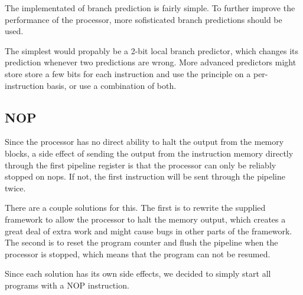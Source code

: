 The implementated of branch prediction is fairly simple. To further improve the
performance of the processor, more sofisticated branch predictions should be
used.

The simplest would propably be a 2-bit local branch predictor, which changes its prediction whenever two predictions are wrong.
More advanced predictors might store store a few bits for each instruction and use the principle on a per-instruction basis, or use a combination of both.\cite{wiki-branching}

\subsection{NOP}

Since the processor has no direct ability to halt the output from the memory blocks, a side effect of sending the output from the instruction memory directly through the first pipeline register is that the processor can only be reliably stopped on nops.
If not, the first instruction will be sent through the pipeline twice.

There are a couple solutions for this.
The first is to rewrite the supplied framework to allow the processor to halt the memory output, which creates a great deal of extra work and might cause bugs in other parts of the framework.
The second is to reset the program counter and flush the pipeline when the processor is stopped, which means that the program can not be resumed.

Since each solution has its own side effects, we decided to simply start all
programs with a NOP instruction.

